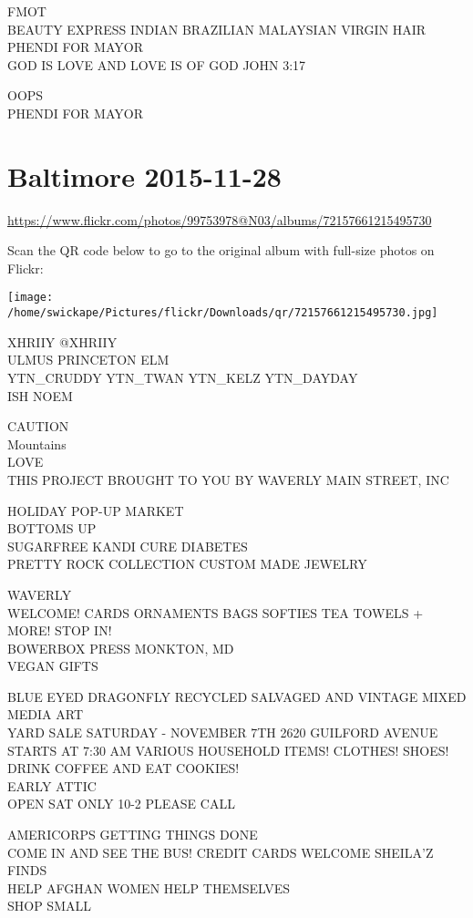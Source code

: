 \documentclass[10pt,letterpaper]{article}
\begin{document}
FMOT\\
BEAUTY EXPRESS INDIAN BRAZILIAN MALAYSIAN VIRGIN HAIR\\
PHENDI FOR MAYOR\\
GOD IS LOVE AND LOVE IS OF GOD JOHN 3:17

OOPS\\
PHENDI FOR MAYOR


\section*{Baltimore 2015-11-28}

\url{https://www.flickr.com/photos/99753978@N03/albums/72157661215495730}

Scan the QR code below to go to the original album with full-size photos on Flickr:

\texttt{[image: /home/swickape/Pictures/flickr/Downloads/qr/72157661215495730.jpg]}


XHRIIY @XHRIIY\\
ULMUS PRINCETON ELM\\
YTN\_CRUDDY YTN\_TWAN YTN\_KELZ YTN\_DAYDAY\\
ISH NOEM

CAUTION\\
Mountains\\
LOVE\\
THIS PROJECT BROUGHT TO YOU BY WAVERLY MAIN STREET, INC

HOLIDAY POP{-}UP MARKET\\
BOTTOMS UP\\
SUGARFREE KANDI CURE DIABETES\\
PRETTY ROCK COLLECTION CUSTOM MADE JEWELRY

WAVERLY\\
WELCOME!  CARDS ORNAMENTS BAGS SOFTIES TEA TOWELS + MORE! STOP IN!\\
BOWERBOX PRESS MONKTON, MD\\
VEGAN GIFTS

BLUE EYED DRAGONFLY RECYCLED SALVAGED AND VINTAGE MIXED MEDIA ART\\
YARD SALE SATURDAY {-} NOVEMBER 7TH 2620 GUILFORD AVENUE STARTS AT 7:30 AM VARIOUS HOUSEHOLD ITEMS!  CLOTHES!  SHOES!  DRINK COFFEE AND EAT COOKIES!\\
EARLY ATTIC\\
OPEN SAT ONLY 10{-}2 PLEASE CALL

AMERICORPS GETTING THINGS DONE\\
COME IN AND SEE THE BUS!  CREDIT CARDS WELCOME SHEILA'Z FINDS\\
HELP AFGHAN WOMEN HELP THEMSELVES\\
SHOP SMALL
\end{document}

